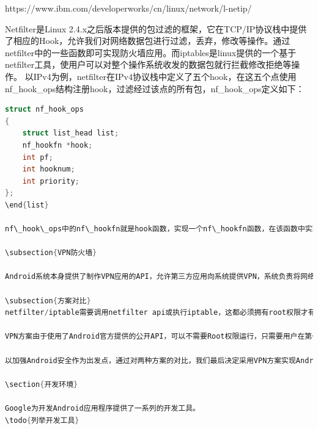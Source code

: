 \documentclass[format=final, language=chinese, degree=fyp]{hustthesis}
\begin{document}
https://www.ibm.com/developerworks/cn/linux/network/l-netip/

Netfilter是Linux 2.4.x之后版本提供的包过滤的框架，它在TCP/IP协议栈中提供了相应的Hook，允许我们对网络数据包进行过滤，丢弃，修改等操作。通过netfilter中的一些函数即可实现防火墙应用。而iptables是linux提供的一个基于netfilter工具，使用户可以对整个操作系统收发的数据包就行拦截修改拒绝等操作。
以IPv4为例，netfilter在IPv4协议栈中定义了五个hook，在这五个点使用nf\_hook\_ops结构注册hook，过滤经过该点的所有包，nf\_hook\_ops定义如下：

\begin{lstlisting}[language=c]
struct nf_hook_ops
{
    struct list_head list;
    nf_hookfn *hook;
    int pf;
    int hooknum;
    int priority;
};
\end{list}

nf\_hook\_ops中的nf\_hookfn就是hook函数，实现一个nf\_hookfn函数，在该函数中实现对包的读取解析并过滤，返回NF\_ACCEP，NF\_DROP等返回值，即可实现对数据包的操作。

\subsection{VPN防火墙}

Android系统本身提供了制作VPN应用的API，允许第三方应用向系统提供VPN，系统负责将网络流量转发到VPN应用，VPN应用可以建立隧道实现VPN服务。而在这个过程中，VPN应用可以对网络流量进行分析和过滤，实现防火墙的功能。

\subsection{方案对比}
netfilter/iptable需要调用netfilter api或执行iptable，这都必须拥有root权限才有可能实现。Root本身就是利用漏洞才得以实现的，并且root之后的手机毫无安全性可言，与我们做防火墙提高安全性的初衷相悖。

VPN方案由于使用了Android官方提供的公开API，可以不需要Root权限运行，只需要用户在第一次启动VPN时授予许可，也没有给系统带来额外的安全风险。其缺陷在于VPN服务只允许启动一个，将会导致用户使用防火墙后无法使用其他VPN。

以加强Android安全作为出发点，通过对两种方案的对比，我们最后决定采用VPN方案实现Android防火墙。

\section{开发环境}

Google为开发Android应用程序提供了一系列的开发工具。
\todo{列举开发工具}


\end{lstlisting}
\end{document}
